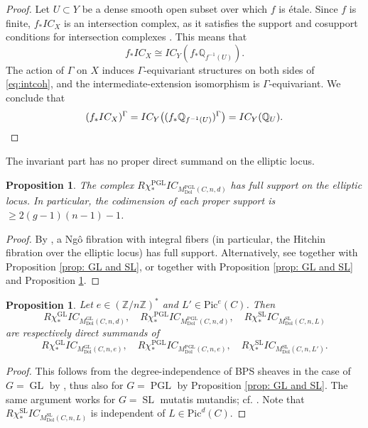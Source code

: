 \documentclass[11pt,reqno]{amsart}
\theoremstyle{plain} %
\newtheorem{prop}[theorem]{Proposition}
\theoremstyle{definition}
\newcommand{\QQ}{\mathbb{Q}}
\newcommand{\ZZ}{\mathbb{Z}}
\DeclareMathOperator{\GL}{GL}
\DeclareMathOperator{\SL}{SL}
\DeclareMathOperator{\PGL}{PGL}
\newcommand{\Dol}{\mathrm{Dol}}
\newcommand{\Pic}{\mathrm{Pic}}
\newcommand{\IC}{IC}
\begin{document}
\begin{proof}
    Let $U \subset Y$ be a dense smooth open subset over which $f$ is \'etale. Since $f$ is finite, $f_* \IC_X$ is an intersection complex, as it satisfies the support and cosupport conditions for intersection complexes \cite[(12), (13)]{dC-Migliorini}. This means that \begin{equation}\label{eq:intcoh}
        f_* \IC_X \cong \IC_Y(f_* \QQ_{f^{-1}(U)}).
    \end{equation} 
    The action of $\Gamma$ on $X$ induces $\Gamma$-equivariant structures on both sides of \eqref{eq:intcoh}, and the intermediate-extension isomorphism is $\Gamma$-equivariant.
We conclude that
\[
(f_* \IC_X)^\Gamma = \IC_Y\big((f_* \QQ_{f^{-1}(U)})^\Gamma\big) = \IC_Y(\QQ_{U}). \qedhere
\]
\end{proof}
The invariant part has no proper direct summand on the elliptic locus.
\begin{prop}\label{prop:fullsupportPGLell}
The complex $R\chi_*^{\PGL} \IC_{M^{\PGL}_{\Dol}(C,n,d)}$ has full support on the elliptic locus.
In particular, the codimension of each proper support is $\geq 2(g-1)(n-1)-1$. 
\end{prop}
\begin{proof}
By \cite[\S 7]{Ngo}, a Ng\^{o} fibration with integral fibers (in particular, the Hitchin fibration over the elliptic locus) has full support. Alternatively, see \cite[Theorem 3.13]{MM} together with Proposition \ref{prop: GL and SL}, or \cite{dCHM2021} 
together with Proposition \ref{prop: GL and SL} and Proposition \ref{prop:chiindependence}.
\end{proof}

\begin{prop}\label{prop:chiindependence}
Let $e \in (\ZZ/n\ZZ)^*$ and $L' \in \Pic^{e}(C)$. Then \[R\chi_*^{\GL} \IC_{M^{\GL}_{\Dol}(C,n,d)}, \quad R\chi_*^{\PGL} \IC_{M^{\PGL}_{\Dol}(C,n,d)}, \quad R\chi^{\SL}_* \IC_{M^{\SL}_{\Dol}(C,n,L)}\] are respectively direct summands of \[R\chi_*^{\GL} \IC_{M^{\GL}_{\Dol}(C,n,e)}, \quad R\chi_*^{\PGL} \IC_{M^{\PGL}_{\Dol}(C,n,e)}, \quad R\chi^{\SL}_* \IC_{M^{\SL}_{\Dol}(C,n,L')}.\]
\end{prop}
\begin{proof}
This follows from the degree-independence of BPS sheaves \cite{Kinjo-Koseki} %
in the case of $G=\GL$ by \cite[Proposition 3.9]{MM}, thus also for $G=\PGL$ by Proposition \ref{prop: GL and SL}. The same argument works for $G=\SL$ mutatis mutandis; cf. \cite[Lemma 8.4]{Padurariu-Toda}. %
Note that $R\chi^{\SL}_* \IC_{M^{\SL}_{\Dol}(C,n,L)}$ is independent of $L \in \Pic^d(C)$.
\end{proof}
\end{document}
